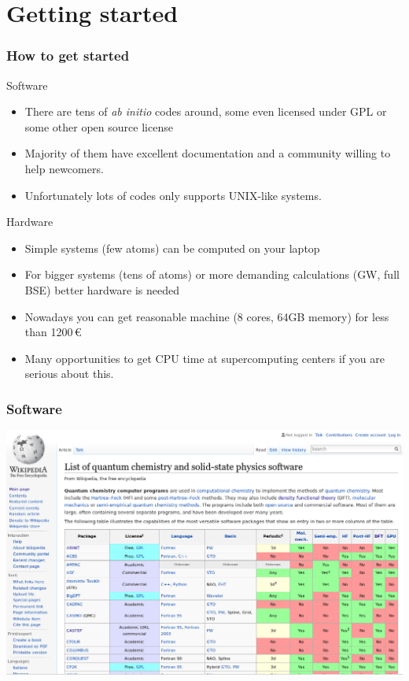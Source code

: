 \documentclass[noamsthm,8pt,t,xcolor={dvipsnames}]{beamer}
\begin{document}
\section{Getting started}
\begin{frame}
   \frametitle{How to get started}
   \begin{block}{Software}
      \begin{itemize}
         \item There are tens of {\it ab initio} codes around, some even licensed under GPL or some other open source license
         \item Majority of them have excellent documentation and a community willing to help newcomers.
         \item Unfortunately lots of codes only supports UNIX-like systems.
      \end{itemize}
   \end{block} 

   \pause

   \begin{block}{Hardware}
      \begin{itemize}
         \item Simple systems (few atoms) can be computed on your laptop
         \item For bigger systems (tens of atoms) or more demanding calculations (GW, full BSE) better hardware is needed
         \item Nowadays you can get reasonable machine (8 cores, 64GB memory) for less than 1200\,€
         \item Many opportunities to get CPU time at supercomputing centers if you are serious about this.
      \end{itemize}
   \end{block}
\end{frame}

\begin{frame}
   \frametitle{Software}
   \begin{center}
      \includegraphics[width=\linewidth]{figures/wiki.png}
   \end{center}
\end{frame}
\end{document}
